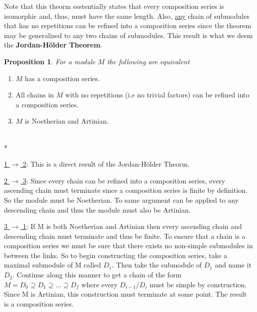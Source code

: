 \documentclass[11pt]{article}
\newtheorem{proposition}{Proposition}
\newenvironment{myproof}[1][\proofname]{\proof[#1]\mbox{}\\*}{\endproof}
\begin{document}
Note that this theorm esstentially states that every composition series is isomorphic and, thus, must have the same length. Also, \underline{any} chain of submodules that has no repetitions can be refined into a composition series since the theorem may be generalized to any two chains of submodules. This result is what we deem the \textbf{Jordan-H{\"o}lder Theorem}. \newline

\newpage 
\noindent
\begin{proposition}For a module $M$ the following are equivalent \end{proposition}

\begin{enumerate}[1.]
   \item $M$ has a composition series.
   \item All chains in $M$ with no repetitions (i.e no trivial factors) can be refined into a composition series.
   \item $M$ is Noetherian and Artinian.
\end{enumerate}

\noindent
\begin{myproof}

\underline{1 $\rightarrow$ 2}: This is a direct result of the Jordan-H{\"o}lder Theorm. \newline

\underline{2 $\rightarrow$ 3}: Since every chain can be refined into a composition series, every ascending chain must terminate since a composition series is finite by definition. So the module must be Noetherian. To same argument can be applied to any
descending chain and thus the module must also be Artinian. \newline

\underline{3 $\rightarrow$ 1}: If M is both Noetherian and Artinian then every ascending chain and descending chain must terminate and thus be finite. To ensure that a chain is a composition series we must be sure that there exists no non-simple submodules in between the links.
So to begin constructing the composition series, take a maximal submodule of M called $D_1$. Then take the submodule of $D_1$ and name it $D_2$. Continue along this manner to get a chain of the form 
$M = D_0 \supseteq D_1 \supseteq ... \supseteq D_f$ where every $D_{i-1}/D_{i}$ must be simple by construction. Since M is Artinian, this construction must terminate at some point. The result is a composition series. \end{myproof}
\end{document}
